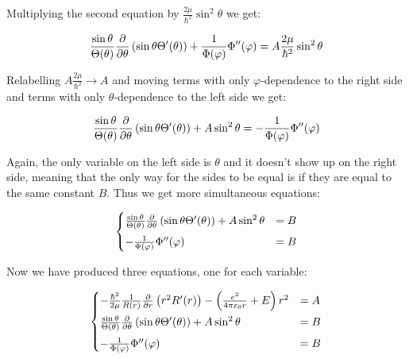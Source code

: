 \documentclass{article}
\begin{document}
    Multiplying the second equation by $\frac{2\mu}{\hbar^2}\sin^2\theta$ we get:

    \begin{equation}
        \frac{\sin\theta}{\Theta(\theta)}\pdv{}{\theta}\left( \sin\theta\Theta'(\theta) \right) + \frac{1}{\Phi(\varphi)}\Phi''(\varphi) = A\frac{2\mu}{\hbar^2}\sin^2\theta
    \end{equation}

    Relabelling $A\frac{2\mu}{\hbar^2} \to A$ and moving terms with only $\varphi$-dependence to the right side and terms with only $\theta$-dependence to the left side we get:

    \begin{equation}
        \frac{\sin\theta}{\Theta(\theta)}\pdv{}{\theta}\left( \sin\theta\Theta'(\theta) \right) + A\sin^2\theta =  -\frac{1}{\Phi(\varphi)}\Phi''(\varphi)
    \end{equation}

    Again, the only variable on the left side is $\theta$ and it doesn't show up on the right side, meaning that the only way for the sides to be equal is if they are equal to the same constant $B$. Thus
    we get more simultaneous equations:

    \begin{equation}
        \begin{cases}
            \frac{\sin\theta}{\Theta(\theta)}\pdv{}{\theta}\left( \sin\theta\Theta'(\theta) \right) + A\sin^2\theta &= B \\[0.5em]    
            -\frac{1}{\Phi(\varphi)}\Phi''(\varphi) &= B
        \end{cases}
    \end{equation}

    Now we have produced three equations, one for each variable:

    \begin{equation}
        \begin{cases}
            -\frac{\hbar^2}{2\mu}\frac{1}{R(r)}\pdv{}{r}\left( r^2R'(r) \right) - \left( \frac{e^{2}}{4\pi\varepsilon_{0}r} + E \right)r^2 &= A \\[0.5em]   
            \frac{\sin\theta}{\Theta(\theta)}\pdv{}{\theta}\left( \sin\theta\Theta'(\theta) \right) + A\sin^2\theta &= B \\[0.5em]    
            -\frac{1}{\Phi(\varphi)}\Phi''(\varphi) &= B
        \end{cases}
    \end{equation}
\end{document}
